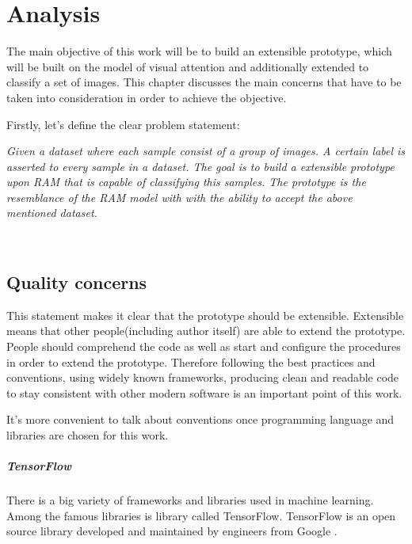 \chapter{Analysis}
\label{ch:analysis}
The main objective of this work will be to build an extensible prototype,
which will be built on the model of visual attention and additionally
extended to classify
a set of images. This chapter discusses the main concerns
that have to be taken into consideration in order to achieve the objective.

Firstly, let's define the clear problem statement:

\textit{
	Given a dataset where each sample consist of a group of images.
	A certain label is asserted to every sample in a dataset. The goal is
	to build a extensible prototype upon RAM that is capable of classifying
	this samples. The prototype is the resemblance of the RAM model with
	with the ability to accept the above mentioned dataset.
}

\\


\section{Quality concerns}
\label{sec:quality_concerns}
This statement makes it clear that the prototype should be extensible. Extensible
means that other people(including author itself) are able to extend the
prototype. People should comprehend the code as well as start and configure
the procedures in order to extend the prototype. Therefore following the best practices
and conventions, using widely known frameworks, producing clean and readable code
to stay consistent with other modern software is an important
point of this work.

It's more convenient to talk about conventions once programming language and
libraries are chosen for this work.
\paragraph{TensorFlow}

There is a big variety of frameworks and libraries used in machine learning.
Among the famous libraries is library called TensorFlow. TensorFlow is an open
source library developed and maintained by engineers from Google \cite{tensorflow2015-whitepaper}.


